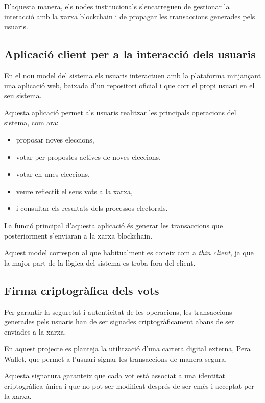 \documentclass[12pt,a4paper]{article}
\begin{document}
D'aquesta manera, els nodes institucionals s'encarreguen de gestionar la interacció amb la xarxa blockchain i de propagar les transaccions generades pels usuaris.

\subsection{Aplicació client per a la interacció dels usuaris}

En el nou model del sistema els usuaris interactuen amb la plataforma mitjançant una aplicació web, baixada d'un repositori oficial i que corr el propi usuari en el seu sistema.

Aquesta aplicació permet als usuaris realitzar les principals operacions del sistema, com ara:

\begin{itemize}
\item proposar noves eleccions,
\item votar per propostes actives de noves eleccions,
\item votar en unes eleccions,
\item veure reflectit el seus vots a la xarxa,
\item i consultar els resultats dels processos electorals.
\end{itemize}

La funció principal d'aquesta aplicació és generar les transaccions que posteriorment s'enviaran a la xarxa blockchain.

Aquest model correspon al que habitualment es coneix com a \textit{thin client}, ja que la major part de la lògica del sistema es troba fora del client.

\subsection{Firma criptogràfica dels vots}

Per garantir la seguretat i autenticitat de les operacions, les transaccions generades pels usuaris han de ser signades criptogràficament abans de ser enviades a la xarxa.

En aquest projecte es planteja la utilització d'una cartera digital externa, Pera Wallet, que permet a l'usuari signar les transaccions de manera segura.

Aquesta signatura garanteix que cada vot està associat a una identitat criptogràfica única i que no pot ser modificat després de ser emès i acceptat per la xarxa.
\end{document}
